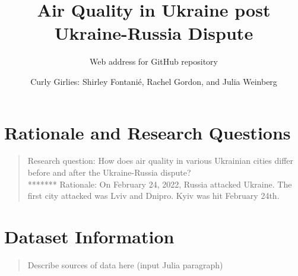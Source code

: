 \documentclass[
  12pt,
]{article}
\title{Air Quality in Ukraine post Ukraine-Russia Dispute}
\subtitle{Web address for GitHub repository}
\author{Curly Girlies: Shirley Fontanié, Rachel Gordon, and Julia
Weinberg}
\date{}
\begin{document}
\maketitle

\newpage
\tableofcontents 
\newpage
\listoftables 
\newpage
\listoffigures 
\newpage

\hypertarget{rationale-and-research-questions}{%
\section{Rationale and Research
Questions}\label{rationale-and-research-questions}}

\begin{quote}
Research question: How does air quality in various Ukrainian cities
differ before and after the Ukraine-Russia dispute?\\
******* Rationale: On February 24, 2022, Russia attacked Ukraine. The
first city attacked was Lviv and Dnipro. Kyiv was hit February 24th.
\end{quote}

\newpage

\hypertarget{dataset-information}{%
\section{Dataset Information}\label{dataset-information}}

\begin{quote}
Describe sources of data here (input Julia paragraph)
\end{quote}
\end{document}
